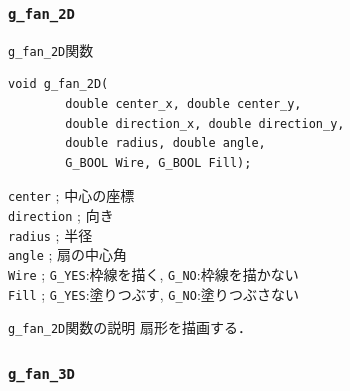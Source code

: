 \documentclass[platex,a4paper,12pt]{jsarticle}%
\begin{document}
\begin{figure}[htb]
\end{figure}




\clearpage
\subsubsection{\texttt{g\_fan\_2D}}

\begin{itembox}[l]{\texttt{g\_fan\_2D}関数}
\begin{verbatim}
void g_fan_2D(
        double center_x, double center_y,
        double direction_x, double direction_y,
        double radius, double angle,
        G_BOOL Wire, G_BOOL Fill);
\end{verbatim}
\verb|center| ; 中心の座標\\
\verb|direction| ; 向き\\
\verb|radius| ; 半径\\
\verb|angle| ; 扇の中心角\\
\verb|Wire| ; \verb|G_YES|:枠線を描く, \verb|G_NO|:枠線を描かない \\
\verb|Fill| ; \verb|G_YES|:塗りつぶす, \verb|G_NO|:塗りつぶさない 
\end{itembox}

\begin{itembox}[l]{\texttt{g\_fan\_2D}関数の説明}
扇形を描画する．
\end{itembox}

\begin{figure}[htb]
\end{figure}


\clearpage
\subsubsection{\texttt{g\_fan\_3D}}
\end{document}
